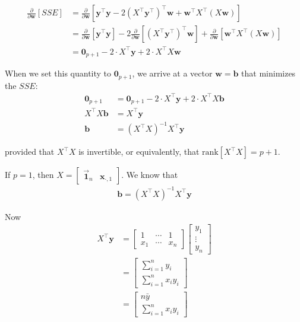 \documentclass[12pt]{article}
\begin{document}
\begin{enumerate}
\begin{align*}
	\frac{\partial}{\partial \mathbf{w}}[SSE]
	&=\frac{\partial}{\partial \mathbf{w}}\left[
	\mathbf{y}^\top\mathbf{y} - 2 (X^\top \mathbf{y}^\top)^\top\mathbf{w}
	+ \mathbf{w}^\top X^\top (X\mathbf{w})
	\right]\\
	&=\frac{\partial}{\partial \mathbf{w}}[\mathbf{y}^\top\mathbf{y}]
	- 2  \frac{\partial}{\partial \mathbf{w}} [(X^\top \mathbf{y}^\top)^\top\mathbf{w}]
	+ \frac{\partial}{\partial \mathbf{w}} [\mathbf{w}^\top X^\top (X\mathbf{w})]\\
	&=\mathbf{0}_{p+1} - 2\cdot X^\top \mathbf{y} + 2\cdot X^\top X\mathbf{w}
\end{align*}

When we set this quantity to $\mathbf{0}_{p+1}$, we arrive at a vector $\mathbf{w}=\mathbf{b}$
that minimizes the $SSE$:
\begin{align*}
	\mathbf{0}_{p+1}&=\mathbf{0}_{p+1} - 2\cdot X^\top \mathbf{y} + 2\cdot X^\top X\mathbf{b}\\
	X^\top X\mathbf{b}&=X^\top \mathbf{y}\\
	\mathbf{b}&=(X^\top X)^{-1}X^\top \mathbf{y}
\end{align*}

provided that $X^\top X$ is invertible, or equivalently, that $\text{rank}[X^\top X]=p+1$.


 

If $p=1$, then $X=\begin{bmatrix}
	\vec{\mathbf{1}}_n & \mathbf{x}_{\cdot, 1}
\end{bmatrix}$. We know that
\begin{align*}
	\mathbf{b} = (X^\top X)^{-1}X^\top\mathbf{y}
\end{align*}

Now
\begin{align*}
	X^\top \mathbf{y}
	&=\begin{bmatrix}
		1 & \cdots & 1\\
		x_1 & \cdots & x_n
	\end{bmatrix}
	\begin{bmatrix}
		y_1\\
		\vdots\\
		y_n
	\end{bmatrix}\\
	&=\begin{bmatrix}
		\sum_{i=1}^{n}y_i\\
		\sum_{i=1}^{n}x_iy_i
	\end{bmatrix}\\
	&=\begin{bmatrix}
		n\bar{y}\\
		\sum_{i=1}^{n}x_iy_i
	\end{bmatrix}
\end{align*}


\end{enumerate}
\end{document}
